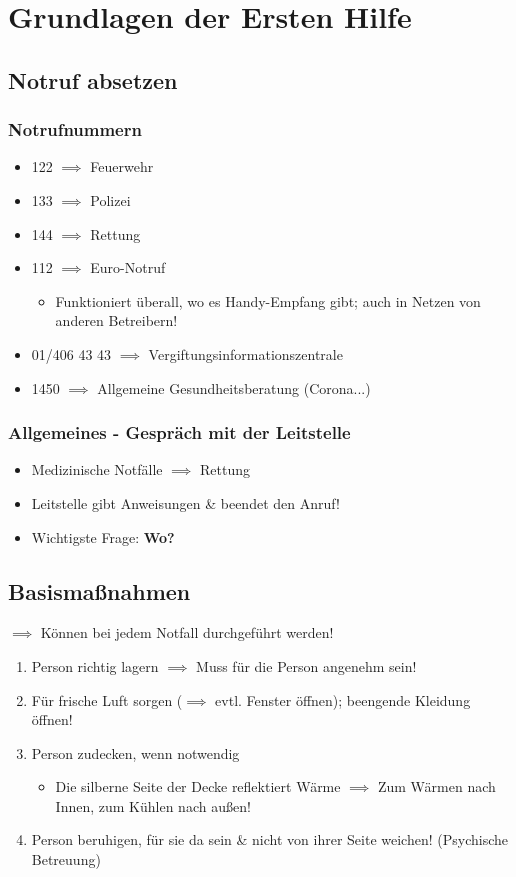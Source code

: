 \part{Grundlagen der Ersten Hilfe}
\chapter{Notruf absetzen}

\section{Notrufnummern}
\begin{itemize}
    \item 122 $\implies$ Feuerwehr
    \item 133 $\implies$ Polizei
    \item 144 $\implies$ Rettung
    \item 112 $\implies$ Euro-Notruf
    \begin{itemize}
        \item Funktioniert überall, wo es Handy-Empfang gibt; auch in Netzen von anderen Betreibern!
    \end{itemize}
    \item 01/406 43 43 $\implies$ Vergiftungsinformationszentrale
    \item 1450 $\implies$ Allgemeine Gesundheitsberatung (Corona...)
\end{itemize}

\section{Allgemeines - Gespräch mit der Leitstelle}
\begin{itemize}
    \item Medizinische Notfälle $\implies$ Rettung
    \item Leitstelle gibt Anweisungen \& beendet den Anruf!
    \item Wichtigste Frage: \textbf{Wo?}
\end{itemize}

\chapter{Basismaßnahmen}
$\implies$ Können bei jedem Notfall durchgeführt werden!
\begin{enumerate}
    \item Person richtig lagern $\implies$ Muss für die Person angenehm sein!
    \item Für frische Luft sorgen ($\implies$ evtl. Fenster öffnen); beengende Kleidung öffnen!
    \item Person zudecken, wenn notwendig
    \begin{itemize}
        \item Die silberne Seite der Decke reflektiert Wärme $\implies$ Zum Wärmen nach Innen, zum Kühlen nach außen!
    \end{itemize}
    \item Person beruhigen, für sie da sein \& nicht von ihrer Seite weichen! (Psychische Betreuung)
\end{enumerate}

